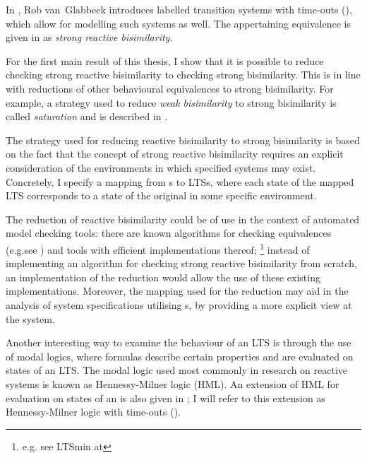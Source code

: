 \begin{isabellebody}
\begin{isamarkuptext}
In \cite{vanglabbeek2021failure}, Rob van~Glabbeek introduces labelled transition systems with time-outs (\LTSt{}), which allow for modelling such systems as well.
The appertaining equivalence is given in \cite{rbs} as \emph{strong reactive bisimilarity}.

For the first main result of this thesis, I show that it is possible to reduce checking strong reactive bisimilarity to checking strong bisimilarity. This is in line with reductions of other behavioural equivalences to strong bisimilarity. For example, a strategy used to reduce \emph{weak bisimilarity} to strong bisimilarity is called \emph{saturation} and is described in \cite[Section 3.2.5]{advBC_algorithmics}.

The strategy used for reducing reactive bisimilarity to strong bisimilarity is based on the fact that the concept of strong reactive bisimilarity requires an explicit consideration of the environments in which specified systems may exist. Concretely, I specify a mapping from \LTSt{}s to LTSs, where each state of the mapped LTS corresponds to a state of the original \LTSt{} in some specific environment.

The reduction of reactive bisimilarity could be of use in the context of automated model checking tools: there are known algorithms for checking equivalences (e.g.\@ see \cite{advBC_algorithmics}) and tools with efficient implementations thereof;%
\footnote{e.g. see LTSmin at }
instead of implementing an algorithm for checking strong reactive bisimilarity from scratch, an implementation of the reduction would allow the use of these existing implementations.
Moreover, the mapping used for the reduction may aid in the analysis of system specifications utilising \LTSt{}s, by providing a more explicit view at the system.

Another interesting way to examine the behaviour of an LTS is through the use of modal logics, where formulas describe certain properties and are evaluated on states of an LTS. The modal logic used most commonly in research on reactive systems is known as Hennessy-Milner logic (HML). 
An extension of HML for evaluation on states of an \LTSt{} is also given in \cite{rbs}; I will refer to this extension as Hennessy-Milner logic with time-outs (\HMLt{}).


\end{isamarkuptext}
\end{isabellebody}
